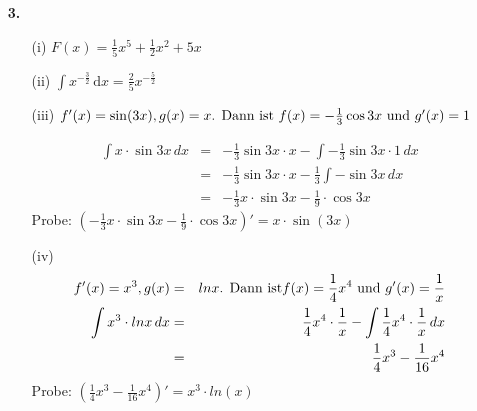 \documentclass[a4paper,11pt,fleqn]{scrartcl}
\newcommand{\dx}[0]{\, \mathrm{d}x}
\begin{document}
\begin{enumerate}
\begin{enumerate}
\begin{multicols}{2}
            \end{multicols}
        \end{enumerate}
    \item[\textbf{3.}]
        \begin{enumerate}
            \item[(i)]
                $F(x) = \frac{1}{5}x^5 + \frac{1}{2}x^2 + 5x$

            \item[(ii)]
                $\int x^{-\frac{3}{2}} \dx = \frac{2}{5} x^{-\frac{5}{2}}$

            \item[(iii)]
                $f'(x)=\sin (3x) , g(x)=x \textnormal{. Dann ist } f(x)= -\frac{1}{3} \cos 3x \textnormal{ und } g'(x)=1$

            \begin{eqnarray*}
                \int x\cdot\sin 3x \, dx &=& -\frac{1}{3}\sin 3x \cdot x - \int - \frac{1}{3} \sin 3x \cdot 1 \, dx \nonumber  \\
                &=& -\frac{1}{3}\sin 3x \cdot x - \frac{1}{3} \int -\sin 3x \, dx \nonumber \\
                &=&-\frac{1}{3} x \cdot \sin 3x  -\frac{1}{9} \cdot \cos 3x \nonumber \nonumber
            \end{eqnarray*}
            Probe: $\left( -\frac{1}{3} x \cdot \sin 3x  -\frac{1}{9} \cdot \cos 3x \right)' = x\cdot\sin (3x)$

            \item[(iv)]
            \begin{eqnarray*}
                f'(x)=x^3 , g(x)&=&ln x \textnormal{. Dann ist} f(x)= \frac{1}{4}x^4 \textnormal{ und } g'(x)=\frac{1}{x} \nonumber \\
                \int x^3 \cdot ln x \, dx &=& \frac{1}{4}x^4 \cdot \frac{1}{x} - \int \frac{1}{4}x^4 \cdot \frac{1}{x} \, dx \nonumber  \\
                &=& \frac{1}{4}x^3 - \frac{1}{16} x^4 \nonumber
            \end{eqnarray*}
            Probe: $\left( \frac{1}{4}x^3 - \frac{1}{16} x^4 \right)' = x^3 \cdot ln(x)$


\end{enumerate}
\end{enumerate}
\end{document}
